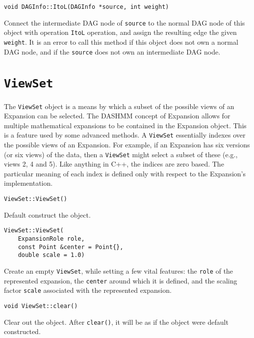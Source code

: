 \begin{lstlisting}
void DAGInfo::ItoL(DAGInfo *source, int weight)
\end{lstlisting}

\noindent Connect the intermediate DAG node of \texttt{source} to the normal
DAG node of this object with operation \texttt{ItoL} operation, and assign
the resulting edge the given \texttt{weight}. It is an error to call this
method if this object does not own a normal DAG node, and if the
\texttt{source} does not own an intermediate DAG node.



\section{\texttt{ViewSet}}

The \texttt{ViewSet} object is a means by which a subset of the possible views
of an Expansion can be selected. The DASHMM concept of Expansion allows for
multiple mathematical expansions to be contained in the Expansion object. This
is a feature used by some advanced methods. A \texttt{ViewSet} essentially
indexes over the possible views of an Expansion. For example, if an
Expansion has six versions (or six views) of the data, then a \texttt{ViewSet}
might select a subset of these (e.g., views 2, 4 and 5). Like anything in C++,
the indices are zero based. The particular meaning of each index is defined
only with respect to the Expansion's implementation.

\begin{lstlisting}
ViewSet::ViewSet()
\end{lstlisting}

\noindent Default construct the object.

\begin{lstlisting}
ViewSet::ViewSet(
    ExpansionRole role,
    const Point &center = Point{},
    double scale = 1.0)
\end{lstlisting}

\noindent Create an empty \texttt{ViewSet}, while setting a few vital features:
the \texttt{role} of the represented expansion, the \texttt{center} around
which it is defined, and the scaling factor \texttt{scale} associated with the
represented expansion.

\begin{lstlisting}
void ViewSet::clear()
\end{lstlisting}

\noindent Clear out the object. After \texttt{clear()}, it will be as if the
object were default constructed.

